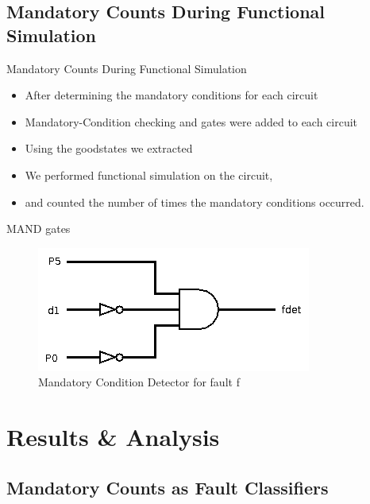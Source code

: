 \documentclass{beamer}
\begin{document}
\subsection{Mandatory Counts During Functional Simulation}
\begin{frame}{Mandatory Counts During Functional Simulation}
\begin{itemize}
    \pause 
    \item After determining the mandatory conditions for each circuit
    \pause 
    \item Mandatory-Condition checking and gates were added to each circuit
    \pause 
    \item Using the goodstates we extracted 
    \pause
    \item We performed functional simulation on the circuit, 
    \pause 
    \item and counted the number of times the mandatory conditions occurred. 
    \end{itemize}
\end{frame}

\begin{frame}{MAND gates}
\begin{figure}[h!]
\centering
\caption{Mandatory Condition Detector for fault f\label{fig:mandgate}}
\includegraphics[scale=0.5]{Images/mand.png}
\end{figure} 
\end{frame}

\section{Results \& Analysis}
\frame{\tableofcontents[currentsection]}
\subsection{Mandatory Counts as Fault Classifiers}
\end{document}
